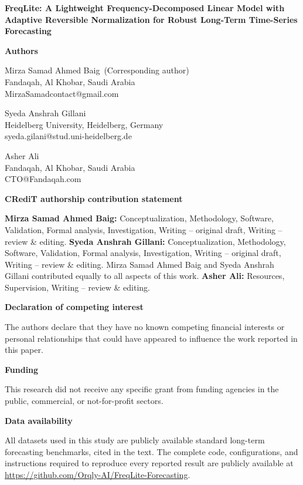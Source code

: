 \documentclass[11pt]{article}
\begin{document}
\begin{center}
{\Large\bfseries FreqLite: A Lightweight Frequency-Decomposed Linear Model with
Adaptive Reversible Normalization for Robust Long-Term Time-Series Forecasting}
\end{center}

\vspace{12pt}
\textbf{Authors}

Mirza Samad Ahmed Baig\, (Corresponding author) \\
Fandaqah, Al Khobar, Saudi Arabia \\
MirzaSamadcontact@gmail.com

\vspace{6pt}
Syeda Anshrah Gillani\, \\
Heidelberg University, Heidelberg, Germany \\
syeda.gilani@stud.uni-heidelberg.de

\vspace{6pt}
Asher Ali \\
Fandaqah, Al Khobar, Saudi Arabia \\
CTO@Fandaqah.com

\vspace{12pt}
\textbf{CRediT authorship contribution statement}

\textbf{Mirza Samad Ahmed Baig:} Conceptualization, Methodology, Software,
Validation, Formal analysis, Investigation, Writing -- original draft,
Writing -- review \& editing. \textbf{Syeda Anshrah Gillani:} Conceptualization,
Methodology, Software, Validation, Formal analysis, Investigation,
Writing -- original draft, Writing -- review \& editing. Mirza Samad Ahmed Baig
and Syeda Anshrah Gillani contributed equally to all aspects of this work.
\textbf{Asher Ali:} Resources, Supervision, Writing -- review \& editing.

\vspace{6pt}
\textbf{Declaration of competing interest}

The authors declare that they have no known competing financial interests or
personal relationships that could have appeared to influence the work reported
in this paper.

\vspace{6pt}
\textbf{Funding}

This research did not receive any specific grant from funding agencies in the
public, commercial, or not-for-profit sectors.

\vspace{6pt}
\textbf{Data availability}

All datasets used in this study are publicly available standard long-term
forecasting benchmarks, cited in the text. The complete code, configurations,
and instructions required to reproduce every reported result are publicly
available at \url{https://github.com/Orqly-AI/FreqLite-Forecasting}.
\end{document}

